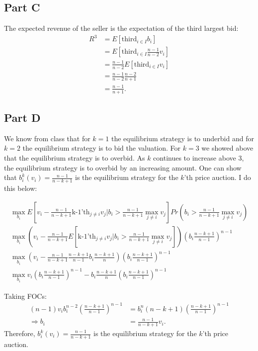 \documentclass[11pt]{article} %
\begin{document}
\subsection{Part C}
The expected revenue of the seller is the expectation of the third largest bid:
\begin{align*}
R^3 &= E[\text{third}_{i\in I} b_i]\\
&= E[\text{third}_{i\in I}  \frac{n-1}{n-2}v_i]\\
&=  \frac{n-1}{n-2}E[\text{third}_{i\in I}  v_i]\\
&=  \frac{n-1}{n-2}\frac{n-2}{n+1}\\
&= \frac{n-1}{n+1}.
\end{align*}
\subsection{Part D}
We know from class that for $k =1$ the equilibrium strategy is to underbid and for $k=2$ the equilibrium strategy is to bid the valuation. For $k=3$ we showed above that the equilibrium strategy is to overbid. As $k$ continues to increase above $3$, the equilibrium strategy is to overbid by an increasing amount. One can show that $b^k_i(v_i) = \frac{n-1}{n-k+1}$ is the equilibrium strategy for the $k$'th price auction. I do this below:

\begin{align*}
\max_{b_i}E[v_i - \frac{n-1}{n-k+1}\text{k-1'th}_{j \neq i}v_j|b_i>\frac{n-1}{n-k+1}\max_{j\neq i} v_j]Pr(b_i>\frac{n-1}{n-k+1}\max_{j\neq i} v_j)  \\ %
\max_{b_i}(v_i - \frac{n-1}{n-k+1}E[\text{k-1'th}_{j \neq i}v_j|b_i>\frac{n-1}{n-k+1}\max_{j\neq i} v_j])\left(b_i\frac{n-k+1}{n-1}\right)^{n-1} \\
\max_{b_i}(v_i - \frac{n-1}{n-k+1}\frac{n-k+1}{n-1} b_i \frac{n-k+1}{n})\left(b_i\frac{n-k+1}{n-1}\right)^{n-1}\\
\max_{b_i}v_i\left(b_i\frac{n-k+1}{n-1}\right)^{n-1} -  b_i \frac{n-k+1}{n}\left(b_i\frac{n-k+1}{n-1}\right)^{n-1}
\end{align*}

Taking FOCs:
\begin{align*}
(n-1)v_ib_i^{n-2}\left(\frac{n-k+1}{n-1}\right)^{n-1} &= b_i^n (n-k+1)\left(\frac{n-k+1}{n-1}\right)^{n-1}\\
\Rightarrow b_i &=\frac{n-1}{n-k+1}v_i .
\end{align*}
Therefore, $b^k_i(v_i) = \frac{n-1}{n-k+1}$ is the equilibrium strategy for the $k$'th price auction.
\end{document}
